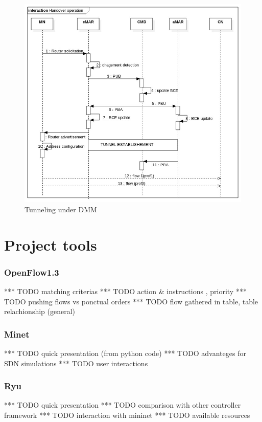 \documentclass{article}
\begin{document}
\begin{figure}[h!]
  \centering
    \includegraphics[scale=0.5]{reportPictures/figure8.jpg}
  \caption{Tunneling under DMM}
\end{figure}



\part{Project tools}

\section{OpenFlow1.3}
*** TODO matching criterias
*** TODO action & instructions , priority 
*** TODO pushing flows vs ponctual orders 
*** TODO flow gathered in table, table relachionship (general)
\section{Minet}
*** TODO quick presentation (from python code) 
*** TODO advanteges for SDN simulations
*** TODO user interactions
\section{Ryu}
*** TODO quick presentation
*** TODO comparison with other controller framework
*** TODO interaction with mininet
*** TODO available resources
\end{document}
